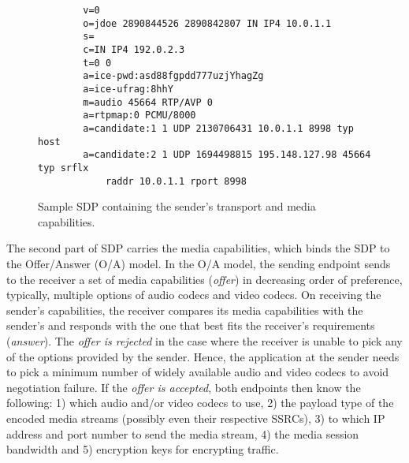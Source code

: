 
\begin{figure}[!h]
{\small
\begin{verbatim}
        v=0
        o=jdoe 2890844526 2890842807 IN IP4 10.0.1.1
        s=
        c=IN IP4 192.0.2.3
        t=0 0
        a=ice-pwd:asd88fgpdd777uzjYhagZg
        a=ice-ufrag:8hhY
        m=audio 45664 RTP/AVP 0
        a=rtpmap:0 PCMU/8000
        a=candidate:1 1 UDP 2130706431 10.0.1.1 8998 typ host
        a=candidate:2 1 UDP 1694498815 195.148.127.98 45664 typ srflx 
            raddr 10.0.1.1 rport 8998
\end{verbatim}
}
\caption{Sample SDP containing the sender's transport and media capabilities.}
\label{fig:3:sdp}
\end{figure}

The second part of SDP carries the media capabilities, which binds the SDP to
the Offer/Answer (O/A) model. In the O/A model, the sending endpoint sends to
the receiver a set of media capabilities (\emph{offer}) in decreasing order of
preference, typically, multiple options of audio codecs and video codecs. On
receiving the sender's capabilities, the receiver compares its media
capabilities with the sender's and responds with the one that best fits the
receiver's requirements (\emph{answer}). The \emph{offer is rejected} in the
case where the receiver is unable to pick any of the options provided by the
sender. Hence, the application at the sender needs to pick a minimum number of
widely available audio and video codecs to avoid negotiation failure. If the
\emph{offer is accepted}, both endpoints then know the following: 1) which
audio and/or video codecs to use, 2) the payload type of the encoded media
streams (possibly even their respective SSRCs), 3) to which IP address and
port number to send the media stream, 4) the media session bandwidth and 5)
encryption keys for encrypting traffic.
